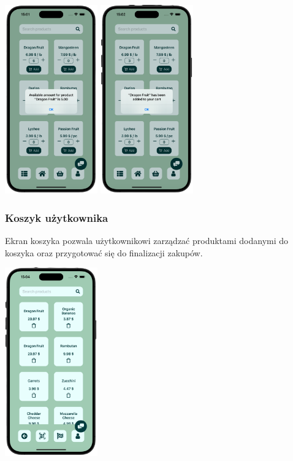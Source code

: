 \begin{center} 
    \includegraphics[width=0.3\textwidth]{images/front/products_amount.png}  
    \includegraphics[width=0.3\textwidth]{images/front/products_added.png}  
\end{center}

\subsubsection{Koszyk użytkownika}

Ekran koszyka pozwala użytkownikowi zarządzać produktami dodanymi do koszyka oraz przygotować się do finalizacji zakupów. 

\begin{center}
    \includegraphics[width=0.3\textwidth]{images/front/cart_page.png}
\end{center}

